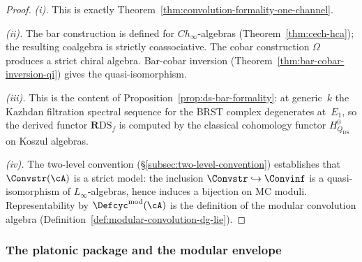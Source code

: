 \begin{proof}
\emph{(i).}
This is exactly
Theorem~\ref{thm:convolution-formality-one-channel}.

\smallskip\noindent
\emph{(ii).}
The bar construction is defined for $Ch_\infty$-algebras
(Theorem~\ref{thm:cech-hca}); the resulting coalgebra
is strictly coassociative.  The cobar construction
$\Omega$ produces a strict chiral algebra.
Bar-cobar inversion
(Theorem~\ref{thm:bar-cobar-inversion-qi}) gives
the quasi-isomorphism.

\smallskip\noindent
\emph{(iii).}
This is the content of
Proposition~\ref{prop:ds-bar-formality}: at generic~$k$ the
Kazhdan filtration spectral sequence for the BRST complex
degenerates at~$E_1$, so the derived functor
$\mathbf{R}\mathrm{DS}_f$ is computed by the classical
cohomology functor $H^0_{Q_{\mathrm{DS}}}$ on Koszul algebras.

\smallskip\noindent
\emph{(iv).}
The two-level convention
(\S\ref{subsec:two-level-convention}) establishes that
$\Convstr(\cA)$ is a strict model:
the inclusion $\Convstr \hookrightarrow \Convinf$ is a
quasi-isomorphism of $L_\infty$-algebras, hence
induces a bijection on MC moduli.
Representability by $\Defcyc^{\mathrm{mod}}(\cA)$
is the definition of the modular convolution algebra
(Definition~\ref{def:modular-convolution-dg-lie}).
\end{proof}


\subsubsection{The platonic package and the modular envelope}


